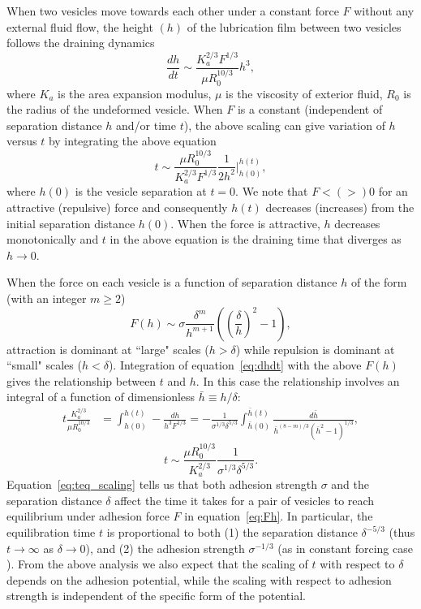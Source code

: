 \documentclass[%
preprint,
 amsmath,amssymb,
 aps,
]{revtex4-1}
\begin{document}
When two vesicles move towards each other under a constant force $F$ without any external fluid flow, the height  $(h)$ of the lubrication film between two vesicles follows the
draining dynamics \cite{RamachandranLeal2010_PoF}
\begin{equation}
\label{eq:dhdt}
\frac{d h}{dt} \sim \frac{K_a^{2/3} F^{1/3}}{\mu R_0^{10/3}} h^3,
\end{equation}
where $K_a$ is the area expansion modulus, $\mu$ is the viscosity of exterior fluid, $R_0$ is the radius of the undeformed vesicle.
When $F$ is a constant (independent of separation distance $h$ and/or time $t$), the above scaling can give variation of $h$ versus $t$ by integrating the above equation
\begin{equation}
t \sim \frac{\mu R_0^{10/3}}{K_a^{2/3} F^{1/3}}\frac{1}{2 h^2} \bigg|^{h(t)}_{h(0)},
\end{equation}
where $h(0)$ is the vesicle separation at $t=0$.
We note that $F< (>) 0$ for an attractive  (repulsive) force and consequently $h(t)$ decreases (increases) from  the initial separation distance $h(0)$. 
When the force is attractive, $h$ decreases monotonically and $t$ in the above
equation is the
draining time that diverges as $h\rightarrow 0$.

When the force on each vesicle is a function of separation distance $h$ of the form (with an integer $m\ge 2$)
\begin{equation}
\label{eq:Fh}
F(h) \sim \sigma \frac{\delta^m}{h^{m+1}}\left(\left(\frac{\delta}{h}\right)^2-1\right),
\end{equation}
attraction is dominant at ``large" scales ($h > \delta$) while repulsion is dominant at ``small" scales ($h<\delta$).
Integration of equation~\ref{eq:dhdt} with the above $F(h)$ gives the relationship between $t$ and $h$.
In this case the relationship involves an integral of a function of dimensionless $\bar{h} \equiv h/\delta$:
\begin{align}
t\frac{K_a^{2/3}}{\mu R_0^{10/3}}& = \int^{h(t)}_{h(0)}-\frac{dh}{h^3 F^{1/3}} = -\frac{1}{\sigma^{1/3}\delta^{5/3}}\int^{\bar{h}(t)}_{\bar{h}(0)}\frac{d \bar{h}}{\bar{h}^{(8-m)/3}(\bar{h}^2-1)^{1/3}},
\end{align}
\begin{equation}
\label{eq:teq_scaling}
t\sim \frac{\mu R_0^{10/3}}{K_a^{2/3}}\frac{1}{\sigma^{1/3}\delta^{5/3}}.
\end{equation}
Equation~\ref{eq:teq_scaling} tells us that both adhesion strength $\sigma$ and the separation distance $\delta$ affect
the time it takes for a pair of vesicles to reach equilibrium under adhesion force $F$ in equation~\ref{eq:Fh}.  In particular, the equilibration time $t$ 
is proportional to both (1) the separation distance $\delta^{-5/3}$ (thus $t\rightarrow \infty$ as $\delta\rightarrow 0$), and (2) the adhesion strength $\sigma^{-1/3}$ 
(as in constant forcing case \cite{RamachandranLeal2010_PoF}).  From the above analysis we also expect that the scaling of $t$ with respect to $\delta$ depends on the
adhesion potential, while the scaling with respect to adhesion strength is independent of the specific form of the potential.
\end{document}
